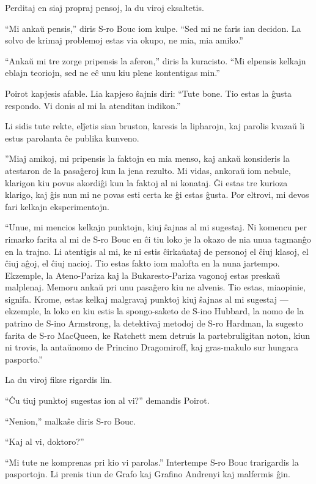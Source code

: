 Perditaj en siaj propraj pensoj, la du viroj eksaltetis.

``Mi ankaŭ pensis,'' diris S-ro Bouc iom kulpe. ``Sed mi ne faris ian decidon. La solvo de krimaj problemoj estas via okupo, ne mia, mia amiko.''

``Ankaŭ mi tre zorge pripensis la aferon,'' diris la kuracisto. ``Mi elpensis kelkajn eblajn teoriojn, sed ne eĉ unu kiu plene kontentigas min.''

Poirot kapjesis afable. Lia kapjeso ŝajnis diri: ``Tute bone. Tio estas la ĝusta respondo. Vi donis al mi la atenditan indikon.''

Li sidis tute rekte, elĵetis sian bruston, karesis la lipharojn, kaj parolis kvazaŭ li estus parolanta ĉe publika kunveno.

''Miaj amikoj, mi pripensis la faktojn en mia menso, kaj ankaŭ konsideris la atestaron de la pasaĝeroj kun la jena rezulto. Mi vidas, ankoraŭ iom nebule, klarigon kiu povus akordiĝi kun la faktoj al ni konataj. Ĝi estas tre kurioza klarigo, kaj ĝis nun mi ne povas esti certa ke ĝi estas ĝusta. Por eltrovi, mi devos fari kelkajn eksperimentojn.

``Unue, mi mencios kelkajn punktojn, kiuj ŝajnas al mi sugestaj. Ni komencu per rimarko farita al mi de S-ro Bouc en ĉi tiu loko je la okazo de nia unua tagmanĝo en la trajno. Li atentigis al mi, ke ni estis ĉirkaŭataj de personoj el ĉiuj klasoj, el ĉiuj aĝoj, el ĉiuj nacioj. Tio estas fakto iom malofta en la nuna jartempo. Ekzemple, la Ateno-Pariza kaj la Bukaresto-Pariza vagonoj estas preskaŭ malplenaj. Memoru ankaŭ pri unu pasaĝero kiu ne alvenis. Tio estas, miaopinie, signifa. Krome, estas kelkaj malgravaj punktoj kiuj ŝajnas al mi sugestaj --- ekzemple, la loko en kiu estis la spongo-saketo de S-ino Hubbard, la nomo de la patrino de S-ino Armstrong, la detektivaj metodoj de S-ro Hardman, la sugesto farita de S-ro MacQueen, ke Ratchett mem detruis la partebruligitan noton, kiun ni trovis, la antaŭnomo de Princino Dragomiroff, kaj gras-makulo sur hungara pasporto.''

La du viroj fikse rigardis lin.

``Ĉu tiuj punktoj sugestas ion al vi?'' demandis Poirot.

``Nenion,'' malkaŝe diris S-ro Bouc.

``Kaj al vi, doktoro?''

``Mi tute ne komprenas pri kio vi parolas.'' Intertempe S-ro Bouc trarigardis la pasportojn. Li prenis tiun de Grafo kaj Grafino Andrenyi kaj malfermis ĝin.

